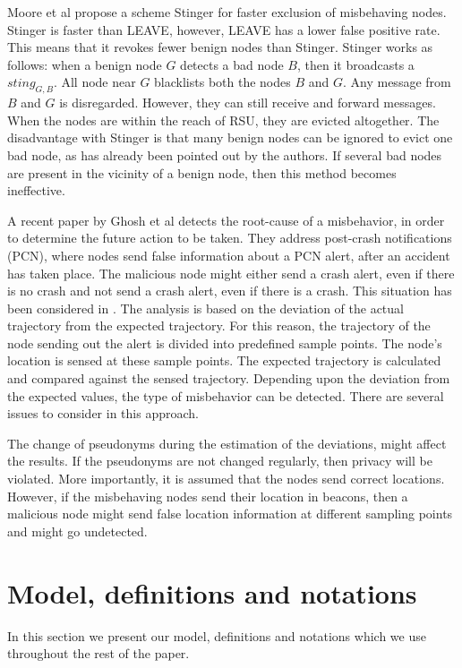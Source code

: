 \documentclass[conference]{IEEEtran}[10pt]
\begin{document}
Moore et al \cite{MRCPAH08} propose a scheme Stinger for faster exclusion of misbehaving nodes. 
Stinger is faster than LEAVE, however, LEAVE has a lower false positive rate. This means that
it revokes fewer benign nodes than Stinger. 
Stinger works as follows: when a benign node $G$ detects a bad node $B$, then it broadcasts a $sting_{G,B}$. 
All node near $G$ blacklists both the nodes $B$ and $G$. Any message from $B$ and $G$ is disregarded. 
However, they can still receive and forward messages. 
When the nodes are within the reach of RSU, they are evicted altogether. 
The disadvantage with Stinger is that 
many benign nodes can be ignored to evict one bad node, as has already been pointed out by the authors. 
If several bad nodes are present in the vicinity of a benign node, then this method becomes ineffective. 

A recent paper by Ghosh et al \cite{GVGKM10} detects the root-cause of a misbehavior, in order to determine 
the future action to be taken. 
They address post-crash notifications (PCN), where nodes send false information about a PCN alert, after an accident has taken place.  
The malicious node might either send a crash alert, even if there is no crash and not send a crash alert, 
even if there is a crash.
This situation has been  considered in \cite{GVKG09}.  
The analysis is based on the deviation of the actual trajectory from the expected trajectory. 
For this reason, the trajectory of the node sending out the alert is divided into predefined sample points. 
The node's location is sensed at these sample points.
The expected trajectory is calculated and compared against the sensed trajectory. 
Depending upon the deviation from the expected values, the type of misbehavior can be detected. 
There are several issues to consider in this approach. 

The change of pseudonyms during the estimation of the deviations, might affect the results. 
If the pseudonyms are not changed regularly, then privacy will be violated. 
More importantly, it is assumed that the nodes send correct locations. 
However, if the misbehaving nodes send their location in beacons, then a malicious node might send false location information at different sampling points
and might go undetected. 



\section{Model, definitions and notations}
\label{sec:model_def_not}
In this section we present our model, definitions and notations which we use throughout the rest of the paper. 
\end{document}
